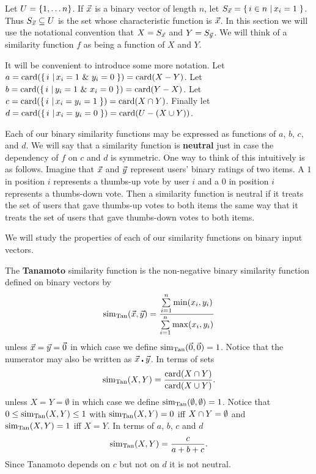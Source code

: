 \documentclass{article}
\begin{document}
Let $U=\left\{1,\dots n\right\}$. If $\vec{x}$ is a binary vector of length $n$, let
$S_{\vec{x}}=\left\{ \, i\in n \, \left| \, x_i=1 \, \right.\right\}$. Thus $S_{\vec{x}}\subseteq U$ is the set whose characteristic
function is $\vec{x}$. In this section we will use the notational convention that
$X=S_{\vec{x}}$ and $Y=S_{\vec{y}}$. We will think of a similarity function $f$ as
being a function of $X$ and $Y$. 

It will be convenient to introduce some more
notation. Let $a=\operatorname{card}(\left\{ \, i \, \left| \, x_i=1 \text{ \& } y_i=0 \, \right.\right\})=\operatorname{card}(X-Y)$. Let
$b=\operatorname{card}(\left\{ \, i \, \left| \, y_i=1\text{ \& } x_i=0 \, \right.\right\})=\operatorname{card}(Y-X)$. Let
$c=\operatorname{card}(\left\{ \, i \, \left| \, x_i=y_i=1 \, \right.\right\})=\operatorname{card}(X\cap Y)$.
Finally let
$d=\operatorname{card}(\left\{ \, i \, \left| \, x_i=y_i=0 \, \right.\right\})=\operatorname{card}(U - (X\cup Y))$. 

Each of our binary similarity functions may be expressed as functions of $a$,
$b$, $c$, and $d$. We will say that a
similarity function is \textbf{neutral} just in case the dependency of $f$ on
$c$ and $d$ is symmetric. One way to think of this intuitively is as follows.
Imagine that $\vec{x}$ and $\vec{y}$ represent users' binary ratings of two items. A
$1$ in position $i$ represents a thumbs-up vote by user $i$ and a 0 in position
$i$ represents a thumbs-down vote. Then a similarity function is neutral if it
treats the set of users that gave thumbs-up votes to both items the same way that it 
treats the set of users that gave thumbs-down votes to both items.

We will study the properties of each of our similarity functions on binary input
vectors.

\begin{example}
The \textbf{Tanamoto} similarity function is the non-negative binary
similarity function defined on binary vectors by 
\begin{equation}
\operatorname{sim_{Tan}}(\vec{x},\vec{y})=\frac{\sum\limits_{i=1}^{n}\min(x_i,y_i)}{\sum\limits_{i=1}^{n}\max(x_i,y_i)}
\end{equation}
unless $\vec{x}=\vec{y}=\vec{0}$ in which case we define $\operatorname{sim_{Tan}}(\vec{0},\vec{0})=1$.
Notice that the numerator may also be written as $\vec{x}\centerdot\vec{y}$. In
terms of sets
\begin{equation}
\operatorname{sim_{Tan}}(X,Y)=\frac{\operatorname{card}(X\cap Y)}{\operatorname{card}(X\cup Y)}.
\end{equation}
unless $X=Y=\emptyset$ in which case we define $\operatorname{sim_{Tan}}(\emptyset,\emptyset)=1$.
Notice that $0\leq \operatorname{sim_{Tan}}(X,Y)\leq 1$ with $\operatorname{sim_{Tan}}(X,Y)=0$ iff
$X\cap Y=\emptyset$ and $\operatorname{sim_{Tan}}(X,Y)=1$ iff $X=Y$.
In terms of $a$, $b$, $c$ and $d$
\begin{equation}
\operatorname{sim_{Tan}}(X,Y)=\frac{c}{a+b+c}.
\end{equation}
Since Tanamoto depends on $c$ but not on $d$ it is not neutral.
\end{example}
\end{document}
